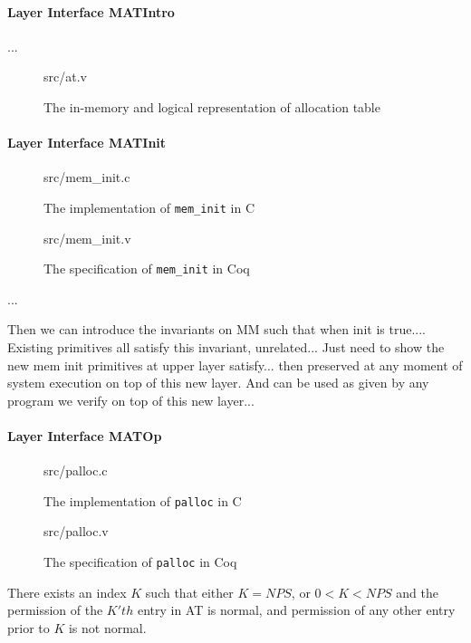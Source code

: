 \paragraph{Layer Interface MATIntro}
...


\begin{figure}
	 {src/at.v}
	\caption{The in-memory and logical representation of allocation table}
	\label{fig:at_v}
\end{figure}

\paragraph{Layer Interface MATInit}

\begin{figure}
	 {src/mem_init.c}
	\caption{The implementation of \texttt{mem\_init} in C}
	\label{fig:mem_init_c}
\end{figure}


\begin{figure}
	 {src/mem_init.v}
	\caption{The specification of \texttt{mem\_init} in Coq}
	\label{fig:mem_init_v}
\end{figure}

...

Then we can introduce the invariants on MM such that when init is true....
Existing primitives all satisfy this invariant, unrelated...
Just need to show the new mem init primitives at upper layer satisfy...
then preserved at any moment of system execution on top of this new layer.
And can be used as given by any program we verify on top of this new layer...

\paragraph{Layer Interface MATOp}

\begin{figure}
	 {src/palloc.c}
	\caption{The implementation of \texttt{palloc} in C}
	\label{fig:palloc_c}
\end{figure}

\begin{figure}
	 {src/palloc.v}
	\caption{The specification of \texttt{palloc} in Coq}
	\label{fig:palloc_v}
\end{figure}

\begin{lemma}[Termination] There exists an index $K$ such that either $K=NPS$, or $0<K<NPS$ and the permission of the $K'th$ entry
in AT is normal, and permission of any other entry prior to $K$ is not normal.
\end{lemma}

